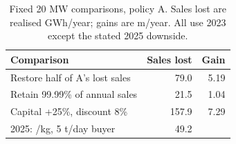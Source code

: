 \begin{table}[H]
\centering\small
\caption{Fixed 20 MW comparisons, policy A. Sales lost are realised GWh/year; gains are \gbp m/year. All use 2023 except the stated 2025 downside.}
\label{tab:comparisons}
\begin{tabularx}{\linewidth}{@{}Y r r@{}}
\toprule
Comparison & Sales lost & Gain \\
\midrule
Restore half of A's lost sales & 79.0 & 5.19 \\
Retain 99.99\% of annual sales & 21.5 & 1.04 \\
Capital +25\%, discount 8\% & 157.9 & 7.29 \\
2025: /kg, 5 t/day buyer & 49.2 &  \\
\bottomrule
\end{tabularx}
\end{table}
